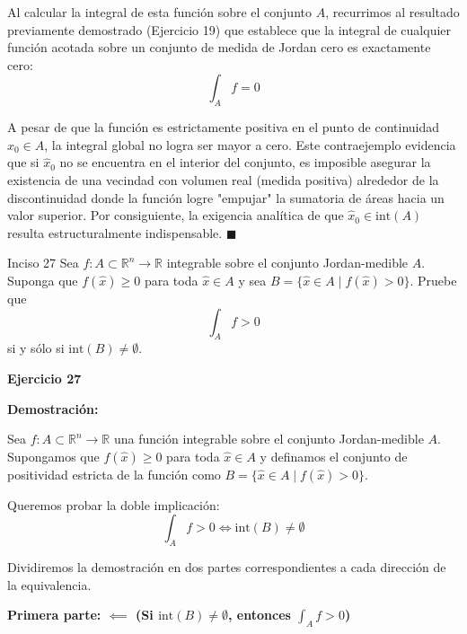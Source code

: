 \documentclass[11pt,letterpaper]{article}
\begin{document}
Al calcular la integral de esta función sobre el conjunto $A$, recurrimos al resultado previamente demostrado (Ejercicio 19) que establece que la integral de cualquier función acotada sobre un conjunto de medida de Jordan cero es exactamente cero:
\begin{equation*}
\int_A f = 0
\end{equation*}

A pesar de que la función es estrictamente positiva en el punto de continuidad $\hat{x}_0 \in A$, la integral global no logra ser mayor a cero. Este contraejemplo evidencia que si $\hat{x}_0$ no se encuentra en el interior del conjunto, es imposible asegurar la existencia de una vecindad con volumen real (medida positiva) alrededor de la discontinuidad donde la función logre "empujar" la sumatoria de áreas hacia un valor superior. Por consiguiente, la exigencia analítica de que $\hat{x}_0 \in \text{int}(A)$ resulta estructuralmente indispensable. \hfill $\blacksquare$

\begin{inciso}{Inciso 27}
Sea $f:A\subset\mathbb{R}^{n}\rightarrow\mathbb{R}$ integrable sobre el conjunto Jordan-medible $A$. Suponga que $f(\hat{x})\ge 0$ para toda $\hat{x}\in A$ y sea $B=\{\hat{x}\in A\mid f(\hat{x})>0\}$. Pruebe que
\begin{equation*}
    \int_{A}f>0
\end{equation*}
si y sólo si $\text{int}(B)\neq\emptyset$.
\end{inciso}

\textbf{Ejercicio 27}

\textbf{Demostración:}

Sea $f: A \subset \mathbb{R}^n \rightarrow \mathbb{R}$ una función integrable sobre el conjunto Jordan-medible $A$. Supongamos que $f(\hat{x}) \ge 0$ para toda $\hat{x} \in A$ y definamos el conjunto de positividad estricta de la función como $B = \{\hat{x} \in A \mid f(\hat{x}) > 0\}$.

Queremos probar la doble implicación:
\begin{equation*}
\int_A f > 0 \iff \text{int}(B) \neq \emptyset
\end{equation*}

Dividiremos la demostración en dos partes correspondientes a cada dirección de la equivalencia.

\vspace{0.5cm}
\textbf{Primera parte: $\impliedby$ (Si $\text{int}(B) \neq \emptyset$, entonces $\int_A f > 0$)}
\end{document}
